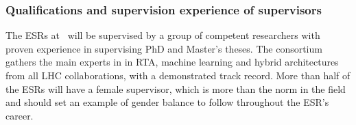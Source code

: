

%




\subsubsection{Qualifications and supervision experience of supervisors}
\label{subsub:qual_supervisors}


The ESRs at \acronym\ will be supervised by a group of competent
researchers with proven experience in supervising PhD and Master's theses. 
The consortium gathers the main experts in in RTA, machine learning and hybrid architectures from
all LHC collaborations, with a demonstrated track record. 
More than half of the ESRs will have a female supervisor, 
which is more than the norm in the field and should set an example of gender balance to follow
throughout the ESR's career. 

